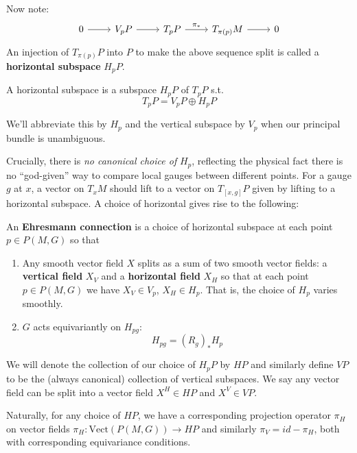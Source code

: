 		Now note:
		\[
		\begin{tikzcd}
			0 \arrow{r} & V_p P \arrow{r} & T_p P \arrow[r,"\pi_*"] & T_{\pi(p)}M \arrow{r} & 0
		\end{tikzcd}	
		\]
		An injection of $T_{\pi(p)} P$ into $P$ to make the above sequence split is called a \textbf{horizontal subspace} $H_pP$. 
		\begin{defn}
			A horizontal subspace is a subspace $H_p P$ of $T_p P$ s.t.
			\begin{equation}
				T_p P = V_p P \oplus H_p P
			\end{equation}
		\end{defn}
		 We'll abbreviate this by $H_p$ and the vertical subspace by $V_p$ when our principal bundle is unambiguous.
	 
		Crucially, there is \emph{no canonical choice of} $H_p$, reflecting the physical fact there is no ``god-given'' way to compare local gauges between different points. For a gauge $g$ at $x$, a vector on $T_x M$ should lift to a vector on $T_{[x,g]} P$ given by lifting to a horizontal subspace. A choice of horizontal gives rise to the following:
		\begin{defn}
		An \textbf{Ehresmann connection} is a choice of horizontal subspace at each point $p \in P(M,G)$ so that
			\begin{enumerate}
				\item Any smooth vector field $X$ splits as a sum of two smooth vector fields: a \textbf{vertical field} $X_V$ and a \textbf{horizontal field} $X_H$ so that at each point $p \in P(M,G)$ we have $X_V \in V_p$, $X_H \in H_p$. That is, the choice of $H_p$ varies smoothly.
				\item $G$ acts equivariantly on $H_{pg}$:
				\begin{equation}
					H_{pg} = (R_{g})_* H_p
				\end{equation}
			\end{enumerate}
		\end{defn}
	
		We will denote the collection of our choice of $H_p P$ by $HP$ and similarly define $VP$ to be the (always canonical) collection of vertical subspaces. We say any vector field can be split into a vector field $X^H \in HP$ and $X^V \in VP$.
	
		Naturally, for any choice of $HP$, we have a corresponding projection operator $\pi_H$ on vector fields $\pi_H: \mathrm{Vect}(P(M,G)) \rightarrow HP$  and similarly $\pi_V = id - \pi_H$, both with corresponding equivariance conditions.
	
